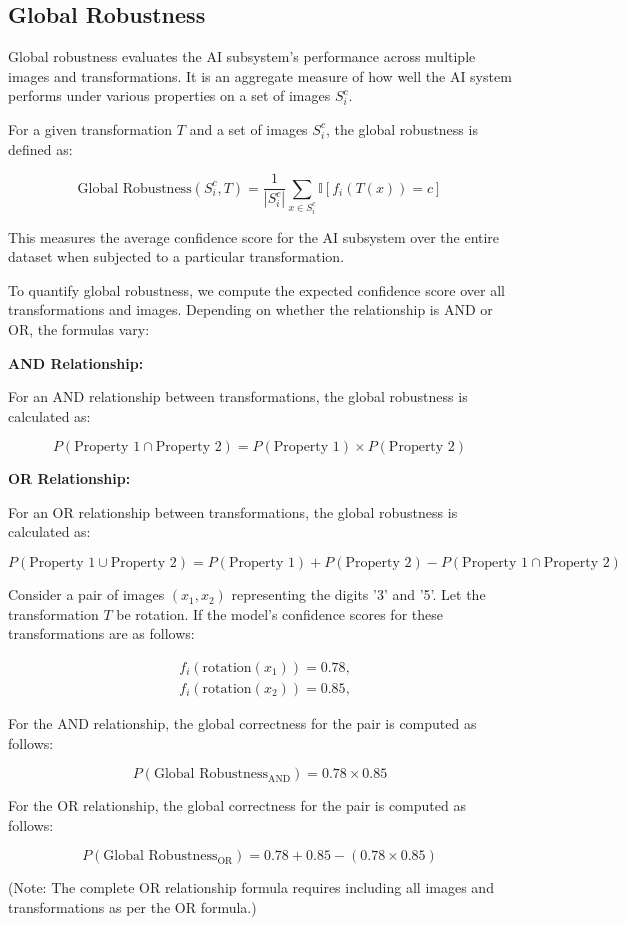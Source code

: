 \subsection{Global Robustness}

Global robustness evaluates the AI subsystem's performance across multiple images and transformations. It is an aggregate measure of how well the AI system performs under various properties on a set of images $S_i^c$.

For a given transformation $T$ and a set of images $S_i^c$, the global robustness is defined as:

$$ \text{Global Robustness}(S_i^c, T) = \frac{1}{|S_i^c|} \sum_{x \in S_i^c} \mathbb{I}[f_i(T(x)) = c] $$

This measures the average confidence score for the AI subsystem over the entire dataset when subjected to a particular transformation.

To quantify global robustness, we compute the expected confidence score over all transformations and images. Depending on whether the relationship is AND or OR, the formulas vary:

\textbf{AND Relationship:}

For an AND relationship between transformations, the global robustness is calculated as:

$$ P(\text{Property 1} \cap \text{Property 2}) = P(\text{Property 1}) \times P(\text{Property 2}) $$

\textbf{OR Relationship:}

For an OR relationship between transformations, the global robustness is calculated as:

$$ P(\text{Property 1} \cup \text{Property 2}) = P(\text{Property 1}) + P(\text{Property 2}) - P(\text{Property 1} \cap \text{Property 2}) $$

\begin{example}
Consider a pair of images $(x_1, x_2)$ representing the digits '3' and '5'. Let the transformation $T$ be rotation. If the model's confidence scores for these transformations are as follows:

$$
\begin{aligned}
&f_i(\text{rotation}(x_1)) = 0.78, \\
&f_i(\text{rotation}(x_2)) = 0.85,
\end{aligned}
$$

For the AND relationship, the global correctness for the pair is computed as follows:

$$P(\text{Global Robustness}_{\text{AND}}) = 0.78 \times 0.85$$

For the OR relationship, the global correctness for the pair is computed as follows:

$$P(\text{Global Robustness}_{\text{OR}}) = 0.78 + 0.85 - (0.78 \times 0.85)$$

(Note: The complete OR relationship formula requires including all images and transformations as per the OR formula.)

\end{example}




